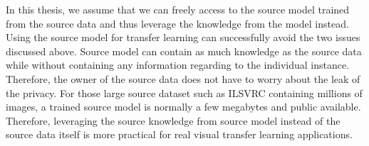 In this thesis, we assume that we can freely access to the source model trained from the source data and thus leverage the knowledge from the model instead. Using the source model for transfer learning can successfully avoid the two issues discussed above. Source model can contain as much knowledge as the source data while without containing any information regarding to the individual instance. Therefore, the owner of the source data does not have to worry about the leak of the privacy. For those large source dataset such as ILSVRC containing millions of images, a trained source model is normally a few megabytes and public available. Therefore, leveraging the source knowledge from source model instead of the source data itself is more practical for real visual transfer learning applications.
